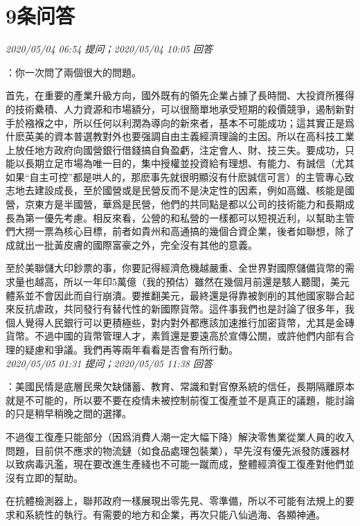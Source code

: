 \documentclass[twocolumn]{ctexart}
\begin{document}
\section{9条问答}

\textit{\hfill\noindent\small 2020/05/04 06:54 提问；2020/05/04 10:05 回答}

：你一次問了兩個很大的問題。

首先，在重要的產業升級方向，國外既有的領先企業占據了長時間、大投資所獲得的技術纍積、人力資源和市場額分，可以很簡單地承受短期的殺價競爭，遏制新對手於襁褓之中，所以任何以利潤為導向的新來者，基本不可能成功；這其實正是爲什麽英美的資本普選教對外也要强調自由主義經濟理論的主因。所以在高科技工業上放任地方政府向國營銀行借錢搞自負盈虧，注定會人、財、技三失。要成功，只能以長期立足市場為唯一目的，集中授權並投資給有理想、有能力、有誠信（尤其如果“自主可控”都是哄人的，那麽事先就很明顯沒有什麽誠信可言）的主管專心致志地去建設成長，至於國營或是民營反而不是決定性的因素，例如高鐵、核能是國營，京東方是半國營，華爲是民營，他們的共同點是都以公司的技術能力和長期成長為第一優先考慮。相反來看，公營的和私營的一樣都可以短視近利，以幫助主管們大撈一票為核心目標，前者如貴州和高通搞的幾個合資企業，後者如聯想，除了成就出一批黃皮膚的國際富豪之外，完全沒有其他的意義。

至於美聯儲大印鈔票的事，你要記得經濟危機越嚴重、全世界對國際儲備貨幣的需求量也越高，所以一年印5萬億（我的預估）雖然在幾個月前還是駭人聽聞，美元體系並不會因此而自行崩潰。要推翻美元，最終還是得靠被剝削的其他國家聯合起來反抗虐政，共同發行有替代性的新國際貨幣。這件事我們也是討論了很多年，我個人覺得人民銀行可以更積極些，對内對外都應該加速推行加密貨幣，尤其是金磚貨幣。不過中國的貨幣管理人才，素質還是要遠高於宣傳公關，或許他們内部有合理的疑慮和爭議。我們再等兩年看看是否會有所行動。
\\

\textit{\hfill\noindent\small 2020/05/05 01:31 提问；2020/05/05 11:38 回答}

：美國民情是底層民衆欠缺儲蓄、教育、常識和對官僚系統的信任，長期隔離原本就是不可能的，所以要不要在疫情未被控制前復工復產並不是真正的議題，能討論的只是稍早稍晚之間的選擇。

不過復工復產只能部分（因爲消費人潮一定大幅下降）解決零售業從業人員的收入問題，目前供不應求的物流鏈（如食品處理包裝業），早先沒有優先派發防護器材以致病毒汎濫，現在要改進生產綫也不可能一蹴而成，整體經濟復工復產對他們並沒有立即的幫助。

在抗體檢測器上，聯邦政府一樣展現出零先見、零準備，所以不可能有法規上的要求和系統性的執行。有需要的地方和企業，再次只能八仙過海、各顯神通。
\end{document}
